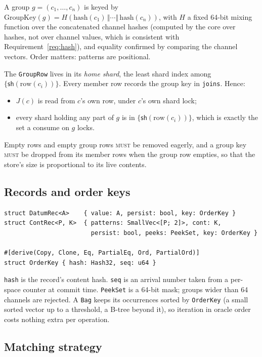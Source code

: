 \documentclass[11pt]{article}
\theoremstyle{plain}
\theoremstyle{definition}
\newcommand{\sh}{\mathsf{sh}}
\newcommand{\MUST}{\textsc{must}}
\newcommand{\code}[1]{\texttt{#1}}
\begin{document}
A group $g=(c_1,\dots,c_n)$ is keyed by
$\mathrm{GroupKey}(g)=H(\mathrm{hash}(c_1)\,\Vert\cdots\Vert\,\mathrm{hash}(c_n))$,
with $H$ a fixed 64-bit mixing function over the concatenated channel hashes
(computed by the core over hashes, not over channel values, which is consistent with
Requirement~\ref{req:hash}), and equality confirmed by comparing the channel
vectors. Order matters: patterns are positional.

The \code{GroupRow} lives in its \emph{home shard}, the least shard index among
$\{\sh(\mathrm{row}(c_i))\}$. Every member row records the group key in
\code{joins}. Hence:
\begin{itemize}[nosep]
\item $J(c)$ is read from $c$'s own row, under $c$'s own shard lock;
\item every shard holding any part of $g$ is in $\{\sh(\mathrm{row}(c_i))\}$, which is
      exactly the set a consume on $g$ locks.
\end{itemize}

Empty rows and empty group rows \MUST{} be removed eagerly, and a group key
\MUST{} be dropped from its member rows when the group row empties, so that the
store's size is proportional to its live contents.

\subsection{Records and order keys}

\begin{lstlisting}
struct DatumRec<A>    { value: A, persist: bool, key: OrderKey }
struct ContRec<P, K>  { patterns: SmallVec<[P; 2]>, cont: K,
                        persist: bool, peeks: PeekSet, key: OrderKey }

#[derive(Copy, Clone, Eq, PartialEq, Ord, PartialOrd)]
struct OrderKey { hash: Hash32, seq: u64 }
\end{lstlisting}

\code{hash} is the record's content hash. \code{seq} is an arrival number taken
from a per-space counter at commit time. \code{PeekSet} is a 64-bit mask; groups
wider than 64 channels are rejected. A \code{Bag} keeps its occurrences sorted by
\code{OrderKey} (a small sorted vector up to a threshold, a B-tree beyond it), so
iteration in oracle order costs nothing extra per operation.

\subsection{Matching strategy}\label{sec:matching}
\end{document}
